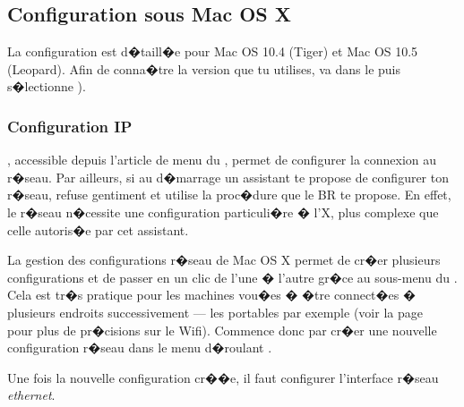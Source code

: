 \clearpage
\pagebreak



\subsection{Configuration sous Mac OS X}

La configuration est d�taill�e pour Mac OS 10.4 (Tiger) et Mac OS 10.5 (Leopard). Afin de conna�tre la version que tu utilises, va dans le  puis s�lectionne ).

\subsubsection{Configuration IP}

 ,
accessible depuis l'article de menu  du
, permet de configurer la connexion au r�seau. Par
ailleurs, si au d�marrage un assistant te propose de configurer ton
r�seau, refuse gentiment et utilise la proc�dure que le BR te
propose. En effet, le r�seau n�cessite une configuration
particuli�re � l'X, plus complexe que celle autoris�e par cet
assistant.

La gestion des configurations r�seau de Mac OS X permet de cr�er
plusieurs configurations et de passer en un clic de l'une � l'autre
gr�ce au sous-menu  du .
Cela est tr�s pratique pour les machines vou�es � �tre connect�es �
plusieurs endroits successivement --- les portables par exemple
(voir la page~\pageref{wifi} pour plus de pr�cisions sur le Wifi).
Commence donc par cr�er une nouvelle configuration r�seau dans le
menu d�roulant .




Une fois la nouvelle configuration cr��e, il faut configurer l'interface r�seau \emph{ethernet}.

